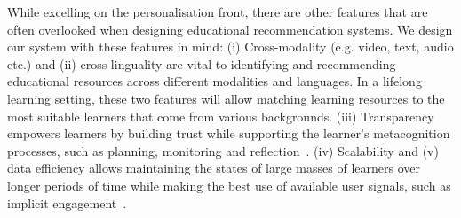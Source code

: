 \documentclass[letterpaper]{article} %
\begin{document}




While excelling on the personalisation front, there are other features that are often overlooked when designing educational recommendation systems. We design our system with these features in mind: 
(i) {Cross-modality} (e.g. video, text, audio etc.) and (ii) {cross-linguality} are vital to identifying and recommending educational resources across different modalities and languages. In a lifelong learning setting, these two features will allow matching learning resources to the most suitable learners that come from various backgrounds. (iii) {Transparency} empowers learners by building trust while supporting the learner's metacognition processes, such as planning, monitoring and reflection~\cite{Bull2016}. (iv) {Scalability} and (v) {data efficiency} allows maintaining the states of large masses of learners over longer periods of time while making the best use of available user signals, such as implicit engagement~\cite{Salehi2014}.


\end{document}
